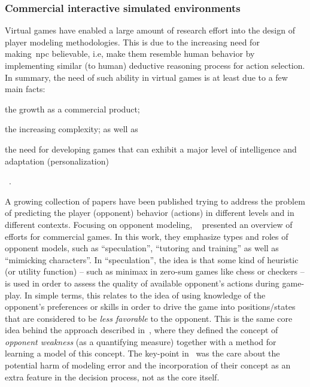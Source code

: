 
\subsubsection{Commercial interactive simulated environments}

Virtual games have enabled a large amount of research effort into the design of player modeling methodologies. This is due to the increasing need for making~\gls{npc} believable, i.e, make them resemble human behavior by implementing similar (to human) deductive reasoning process for action selection. In summary, the need of such ability in virtual games is at least due to a few main facts: \begin{inparaenum}\item the growth as a commercial product; \item the increasing complexity; as well as \item the need for developing games that can exhibit a major level of intelligence and adaptation (personalization)\end{inparaenum}~\citep{bakkes_personalised_2012}. 

A growing collection of papers have been published trying to address the problem of predicting the player (opponent) behavior (actions) in different levels and in different contexts. Focusing on opponent modeling, ~\cite{herik_opponent_2005} presented an overview of efforts for commercial games. In this work, they emphasize types and roles of opponent models, such as ``speculation'', ``tutoring and training'' as well as ``mimicking characters''. In ``speculation'', the idea is that some kind of heuristic (or utility function) -- such as minimax in zero-sum games like chess or checkers -- is used in order to assess the quality of available opponent's actions during game-play. In simple terms, this relates to the idea of using knowledge of the opponent's preferences or skills in order to drive the game into positions/states that are considered to be \textit{less favorable} to the opponent. This is the same core idea behind the approach described in~\cite{markovitch_learning_2005}, where they defined the concept of \textit{opponent weakness} (as a quantifying measure) together with a method for learning a model of this concept. The key-point in~\cite{markovitch_learning_2005} was the care about the potential harm of modeling error and the incorporation of their concept as an extra feature in the decision process, not as the core itself.

